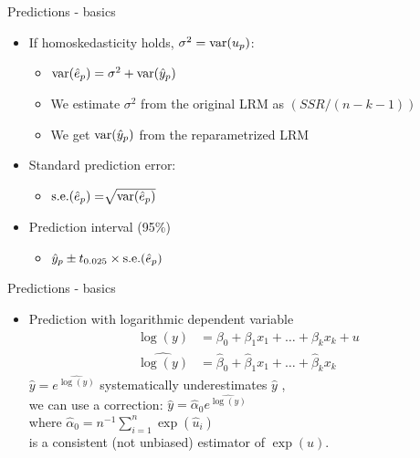 \documentclass{beamer}
\begin{document}
\begin{frame}{Predictions - basics}
\begin{itemize}
\item If homoskedasticity holds, $\sigma^2 = \textnormal{var}(u_p)$: \\

\begin{itemize}
\item $\textnormal{var}(\hat{e}_p) = \sigma^2 + \textnormal{var}(\hat{y}_p)$
\vspace{0.2cm}
\item We estimate $\sigma^2$ from the original LRM as $(\textit{SSR}/(n-k-1))$
\vspace{0.2cm}
\item We get $\textnormal{var}(\hat{y}_p)$ from the reparametrized LRM
\end{itemize}
\vspace{0.5cm}
\item Standard prediction error:
\begin{itemize}
\vspace{0.2cm}
 \item $\textnormal{s.e.}(\hat{e}_p) = \sqrt[]{\textnormal{var}(\hat{e}_p)}$
\end{itemize}
\vspace{0.5cm}
\item Prediction interval (95\%)
\vspace{0.2cm}
\begin{itemize}
\item $\hat{y}_p \pm t_{0.025} \times \textnormal{s.e.}(\hat{e}_p) $
\end{itemize}
\end{itemize}
\end{frame}


\begin{frame}{Predictions - basics}
\begin{itemize}
\item Prediction with logarithmic dependent variable
\begin{align}\nonumber
\log(y) &= \beta_0 + \beta_1 x_1 + \dots + \beta_k x_k + u\\\nonumber
\widehat{\log(y)} &= \hat{\beta}_0 + \hat{\beta}_1 x_1 + \dots + \hat{\beta}_k x_k 
\end{align}
$\hat{y} =e^{\widehat{\log(y)}}$ systematically underestimates $\hat{y}$ , \\
\vspace{0.3cm}
we can use a correction: $\hat{y}=\widehat{\alpha}_0 e^{\widehat{\log(y)}}$ \\
\vspace{0.3cm}
where $\widehat{\alpha}_0 = n^{-1} \sum_{i=1}^n \exp(\hat{u}_i)$ \\
\vspace{0.3cm}
is a consistent (not unbiased) estimator of $\exp{(u)}$.
\end{itemize}
\end{frame}
\end{document}
